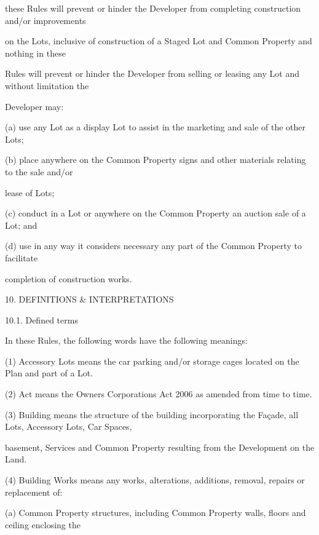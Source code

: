 \documentclass{article}
\begin{document}
{\fontsize{10.02}{1}these Rules will prevent or hinder the Developer from completing construction and/or improvements }

{\fontsize{10.02}{1}on the Lots, inclusive of construction of a Staged Lot and Common Property and nothing in these }

{\fontsize{10.02}{1}Rules will prevent or hinder the Developer from selling or leasing any Lot and without limitation the }

{\fontsize{10.02}{1}Developer may: }

{\fontsize{9.962}{1}(a) use any Lot as a display Lot to assist in the marketing and sale of the other Lots; }

{\fontsize{9.962}{1}(b) place anywhere on the Common Property signs and other materials relating to the sale and/or }

{\fontsize{10.02}{1}lease of Lots; }

{\fontsize{9.962}{1}(c) conduct in a Lot or anywhere on the Common Property an auction sale of a Lot; and }

{\fontsize{9.962}{1}(d) use in any way it considers necessary any part of the Common Property to facilitate }

{\fontsize{10.02}{1}completion of construction works. }

{\fontsize{9.99}{1}10. DEFINITIONS \& INTERPRETATIONS }

{\fontsize{9.99}{1}10.1. Defined terms }

{\fontsize{10.02}{1}In these Rules, the following words have the following meanings: }

{\fontsize{9.962}{1}(1) Accessory Lots means the car parking and/or storage cages located on the Plan and part of a Lot. }

{\fontsize{9.962}{1}(2) Act means the Owners Corporations Act 2006 as amended from time to time. }

{\fontsize{9.962}{1}(3) Building means the structure of the building incorporating the Façade, all Lots, Accessory Lots, Car Spaces, }

{\fontsize{10.02}{1}basement, Services and Common Property resulting from the Development on the Land.  }

{\fontsize{9.962}{1}(4) Building Works means any works, alterations, additions, removal, repairs or replacement of: }

{\fontsize{9.962}{1}(a) Common Property structures, including Common Property walls, floors and ceiling enclosing the }
\end{document}
